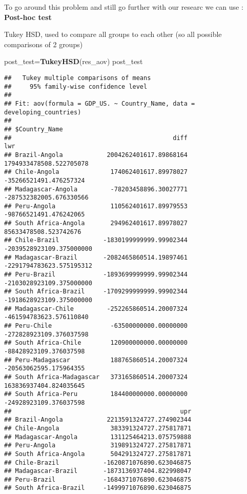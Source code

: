 \documentclass[
]{article}
\newenvironment{Shaded}{\begin{snugshade}}{\end{snugshade}}
\newcommand{\FunctionTok}[1]{\textcolor[rgb]{0.13,0.29,0.53}{\textbf{#1}}}
\newcommand{\NormalTok}[1]{#1}
\newcommand{\OtherTok}[1]{\textcolor[rgb]{0.56,0.35,0.01}{#1}}
\begin{document}
To go around this problem and still go further with our researc we can
use : \textbf{Post-hoc test}

Tukey HSD, used to compare all groups to each other (so all possible
comparisons of 2 groups)

\begin{Shaded}
\begin{Highlighting}[]
\NormalTok{post\_test}\OtherTok{=}\FunctionTok{TukeyHSD}\NormalTok{(res\_aov)}
\NormalTok{post\_test}
\end{Highlighting}
\end{Shaded}

\begin{verbatim}
##   Tukey multiple comparisons of means
##     95% family-wise confidence level
## 
## Fit: aov(formula = GDP_US. ~ Country_Name, data = developing_countries)
## 
## $Country_Name
##                                            diff                      lwr
## Brazil-Angola            2004262401617.89868164  1794933478508.522705078
## Chile-Angola              174062401617.89978027   -35266521491.476257324
## Madagascar-Angola         -78203458896.30027771  -287532382005.676330566
## Peru-Angola               110562401617.89979553   -98766521491.476242065
## South Africa-Angola       294962401617.89978027    85633478508.523742676
## Chile-Brazil            -1830199999999.99902344 -2039528923109.375000000
## Madagascar-Brazil       -2082465860514.19897461 -2291794783623.575195312
## Peru-Brazil             -1893699999999.99902344 -2103028923109.375000000
## South Africa-Brazil     -1709299999999.99902344 -1918628923109.375000000
## Madagascar-Chile         -252265860514.20007324  -461594783623.576110840
## Peru-Chile                -63500000000.00000000  -272828923109.376037598
## South Africa-Chile        120900000000.00000000   -88428923109.376037598
## Peru-Madagascar           188765860514.20007324   -20563062595.175964355
## South Africa-Madagascar   373165860514.20007324   163836937404.824035645
## South Africa-Peru         184400000000.00000000   -24928923109.376037598
##                                              upr
## Brazil-Angola            2213591324727.274902344
## Chile-Angola              383391324727.275817871
## Madagascar-Angola         131125464213.075759888
## Peru-Angola               319891324727.275817871
## South Africa-Angola       504291324727.275817871
## Chile-Brazil            -1620871076890.623046875
## Madagascar-Brazil       -1873136937404.822998047
## Peru-Brazil             -1684371076890.623046875
## South Africa-Brazil     -1499971076890.623046875

\end{verbatim}
\end{document}

